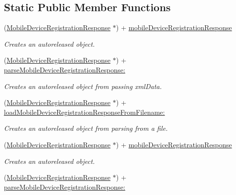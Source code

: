 \subsection*{Static Public Member Functions}
\begin{DoxyCompactItemize}
\item 
(\hyperlink{interface_mobile_device_registration_response}{MobileDeviceRegistrationResponse} $\ast$) + \hyperlink{interface_mobile_device_registration_response_aca1c52c278dd74542f75439de450c506}{mobileDeviceRegistrationResponse}
\begin{DoxyCompactList}\small\item\em Creates an autoreleased object. \item\end{DoxyCompactList}\item 
(\hyperlink{interface_mobile_device_registration_response}{MobileDeviceRegistrationResponse} $\ast$) + \hyperlink{interface_mobile_device_registration_response_ae0e564506ff65b450601f8ad48da2ecd}{parseMobileDeviceRegistrationResponse:}
\begin{DoxyCompactList}\small\item\em Creates an autoreleased object from passing xmlData. \item\end{DoxyCompactList}\item 
(\hyperlink{interface_mobile_device_registration_response}{MobileDeviceRegistrationResponse} $\ast$) + \hyperlink{interface_mobile_device_registration_response_a4dbc56ca78a8ef70d78fdc136e4c9665}{loadMobileDeviceRegistrationResponseFromFilename:}
\begin{DoxyCompactList}\small\item\em Creates an autoreleased object from parsing from a file. \item\end{DoxyCompactList}\item 
(\hyperlink{interface_mobile_device_registration_response}{MobileDeviceRegistrationResponse} $\ast$) + \hyperlink{interface_mobile_device_registration_response_aca1c52c278dd74542f75439de450c506}{mobileDeviceRegistrationResponse}
\begin{DoxyCompactList}\small\item\em Creates an autoreleased object. \item\end{DoxyCompactList}\item 
(\hyperlink{interface_mobile_device_registration_response}{MobileDeviceRegistrationResponse} $\ast$) + \hyperlink{interface_mobile_device_registration_response_ae0e564506ff65b450601f8ad48da2ecd}{parseMobileDeviceRegistrationResponse:}

\end{DoxyCompactItemize}
